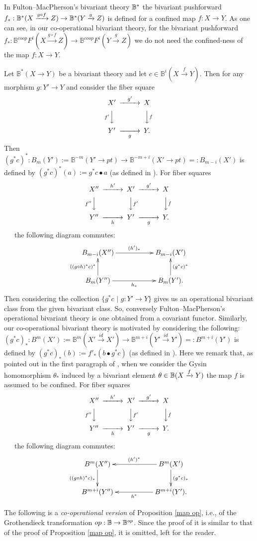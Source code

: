 \documentclass[a4paper]{amsart}
\begin{document}
\begin{rem} In Fulton--MacPherson's bivariant theory $\mathbb B^*$ the bivariant pushforward $f_*:\mathbb B^*(X \xrightarrow {g \circ f} Z) \to \mathbb B^*(Y \xrightarrow g Z)$ is defined for a confined map $f:X \to Y$. As one can see, in our co-operational bivariant theory, for the bivariant pushforward $f_*: \mathbb B^{coop}F^i(X \xrightarrow {g \circ f} Z) \to \mathbb B^{coop}F^i(Y \xrightarrow g Z)$ we do not need the confined-ness of the map $f:X \to Y$.
\end{rem}
\begin{rem} Let $\mathbb B^*(X \to Y)$ be a bivariant theory and let $c \in \mathbb B^i(X \xrightarrow f Y)$.
Then for any morphism $g:Y' \to Y$ and consider the fiber square
$$\CD
X' @> {g'}  >> X\\
@V {f'} VV @VV fV\\
Y' @>> {g} > Y.\\
\endCD
$$
Then $(g^*c)^*: B_m(Y'):=\mathbb B^{-m}(Y' \to pt) \to  \mathbb B^{-m+i}(X' \to pt) =:B_{m-i}(X')$
is defined by $(g^*c)^*(a):=g^*c \bullet a$ (as defined in \cite[\S 2.5 Gysin homomorphisms]{FM}). For fiber squares
$$\CD
X'' @> {h'}  >> X' @> {g'}  >> X\\
@V {f''} VV @VV f'V @VV fV\\
Y'' @>> {h} > Y' @>> {g} > Y.\\
\endCD
$$ \, \, \, 
the following diagram commutes:
$$
\xymatrix
{B_{m-i}(X'') \ar[rr]^{(h')_*} && B_{m-i}(X') \\
 B_m(Y'') \ar[u]^{((g \circ h)^*c)^*}  \ar[rr]_{h_*} && B_m(Y') \ar[u]_{(g^*c)^*}.
}
$$ 
Then considering the collection $\{ g^*c \, \, | \, \, g:Y' \to Y\}$ gives us an operational bivariant 
class from the given bivariant
class. So, conversely Fulton--MacPherson's operational bivariant theory is one obtained from a covariant functor. Similarly, our co-operational bivariant theory is motivated by considering the following:
$(g^*c)_*: B^m(X'):=\mathbb B^m(X' \xrightarrow {id} X') \to \mathbb B^{m+i}(Y' \xrightarrow {id} Y') =: B^{m+i}(Y')$
is defined by $(g^*c)_*(b):=f'_*(b \bullet g^*c)$ (as defined in \cite[\S 2.5 Gysin homomorphisms]{FM}). Here we remark that, as pointed out in the first paragraph of \cite[\S 2.5 Gysin homomorphisms, p.26]{FM}, when we consider the Gysin homomorphism $\theta_*$ induced by a bivariant element $\theta \in \mathbb B (X \xrightarrow f Y)$ the map $f$ is assumed to be confined. For fiber squares
$$\CD
X'' @> {h'}  >> X' @> {g'}  >> X\\
@V {f''} VV @VV f'V @VV fV\\
Y'' @>> {h} > Y' @>> {g} > Y.\\
\endCD
$$ \, \, \, 
the following diagram commutes:
$$
\xymatrix
{B^m(X'') \ar[d]_{((g\circ h)^*c)_*} && B^m(X')\ar[ll]_{(h')^*} \ar[d]^{(g^*c)_*}\\
 B^{m+i}(Y'') && B^{m+i}(Y') \ar[ll]^{h^*}.
}
$$  
\end{rem}
The following is a \emph{co-operational version} of Proposition \ref{map op}, i.e., of the Grothendieck transformation $op: \mathbb B \to \mathbb B^{op}$. Since the proof of it is similar to that of the proof of Proposition \ref{map op}, it is omitted, left for the reader.
\end{document}
